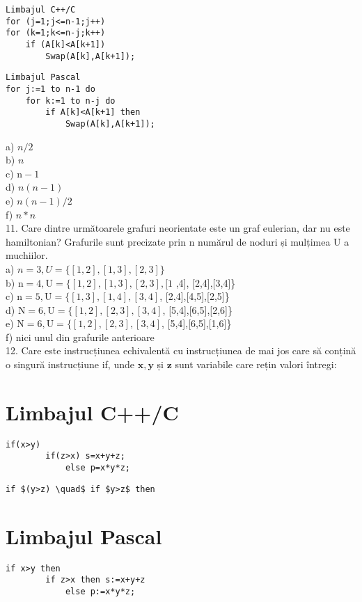 \begin{verbatim}
Limbajul C++/C
for (j=1;j<=n-1;j++)
for (k=1;k<=n-j;k++)
    if (A[k]<A[k+1])
        Swap(A[k],A[k+1]);
\end{verbatim}

\begin{verbatim}
Limbajul Pascal
for j:=1 to n-1 do
    for k:=1 to n-j do
        if A[k]<A[k+1] then
            Swap(A[k],A[k+1]);
\end{verbatim}

a) $n / 2$\\
b) $n$\\
c) $\mathrm{n}-1$\\
d) $n(n-1)$\\
e) $n(n-1) / 2$\\
f) $n * n$\\
11. Care dintre următoarele grafuri neorientate este un graf eulerian, dar nu este hamiltonian? Grafurile sunt precizate prin n numărul de noduri și mulțimea U a muchiilor.\\
a) $n=3, U=\{[1,2],[1,3],[2,3]\}$\\
b) $\mathrm{n}=4, \mathrm{U}=\{[1,2],[1,3],[2,3],[1$ ,4], [2,4],[3,4]\}\\
c) $\mathrm{n}=5, \mathrm{U}=\{[1,3],[1,4],[3,4]$, [2,4],[4,5],[2,5]\}\\
d) $\mathrm{N}=6, \mathrm{U}=\{[1,2],[2,3],[3,4]$, [5,4],[6,5],[2,6]\}\\
e) $\mathrm{N}=6, \mathrm{U}=\{[1,2],[2,3],[3,4]$, [5,4],[6,5],[1,6]\}\\
f) nici unul din grafurile anterioare\\
12. Care este instrucțiunea echivalentă cu instrucțiunea de mai jos care să conțină o singură instrucțiune if, unde $\mathbf{x}, \mathbf{y}$ și $\mathbf{z}$ sunt variabile care rețin valori întregi:

\section*{Limbajul C++/C}
\begin{verbatim}
if(x>y)
        if(z>x) s=x+y+z;
            else p=x*y*z;
\end{verbatim}

\begin{verbatim}
if $(y>z) \quad$ if $y>z$ then
\end{verbatim}

\section*{Limbajul Pascal}
\begin{verbatim}
if x>y then
        if z>x then s:=x+y+z
            else p:=x*y*z;
\end{verbatim}

